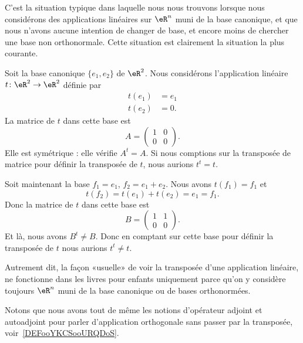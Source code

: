 C'est la situation typique dans laquelle nous nous trouvons lorsque nous considérons des applications linéaires sur \( \eR^n\) muni de la base canonique, et que nous n'avons aucune intention de changer de base, et encore moins de chercher une base non orthonormale. Cette situation est clairement la situation la plus courante.

\begin{example}
    Soit la base canonique \( \{ e_1,e_2 \}\) de \( \eR^2\). Nous considérons l'application linéaire \( t\colon \eR^2\to \eR^2\) définie par
    \begin{subequations}
        \begin{align}
            t(e_1)  & =e_1    \\
            t(e_2)  & =0.
        \end{align}
    \end{subequations}
    La matrice de \( t\) dans cette base est
    \begin{equation}
        A=\begin{pmatrix}
            1    &   0    \\
            0    &   0
        \end{pmatrix}.
    \end{equation}
    Elle est symétrique : elle vérifie \( A^t=A\). Si nous comptions sur la transposée de matrice pour définir la transposée de \( t\), nous aurions \( t^t=t\).

    Soit maintenant la base \( f_1=e_1\), \( f_2=e_1+e_2\). Nous avons \( t(f_1)=f_1\) et
    \begin{equation}
        t(f_2)=t(e_1)+t(e_2)=e_1=f_1.
    \end{equation}
    Donc la matrice de \( t\) dans cette base est
    \begin{equation}
        B=\begin{pmatrix}
            1    &   1    \\
            0    &   0
        \end{pmatrix}.
    \end{equation}
    Et là, nous avons \( B^t\neq B\). Donc en comptant sur cette base pour définir la transposée de \( t\) nous aurions \( t^t\neq t\).
\end{example}

\begin{normaltext}      \label{NooMZVRooExWVKJ}
    Autrement dit, la façon «usuelle» de voir la transposée d'une application linéaire, ne fonctionne dans les livres pour enfants uniquement parce qu'on y considère toujours \( \eR^n\) muni de la base canonique ou de bases orthonormées.

    Notons que nous avons tout de même les notions d'opérateur adjoint et autoadjoint pour parler d'application orthogonale sans passer par la transposée, voir~\ref{DEFooYKCSooURQDoS}.
\end{normaltext}

